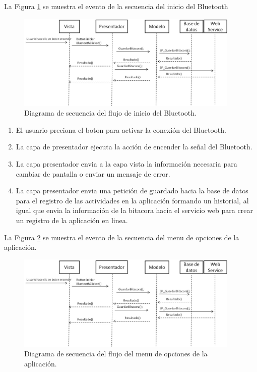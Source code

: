 La Figura \ref{ds2} se muestra el evento de la secuencia del inicio del Bluetooth
%
\begin{figure}[H]
\centering
\includegraphics[width=0.95\textwidth]{metodologia/DSIniciarBluetooth.jpg}
\caption{Diagrama de secuencia del flujo de inicio del Bluetooth.}
\label{ds2}
\end{figure}


 \begin{enumerate}
\item El usuario preciona el boton para activar la conexión del Bluetooth.
\item La capa de presentador ejecuta la acción de encender la señal del Bluetooth.
\item{La capa presentador envia a la capa vista la información necesaria para cambiar de pantalla o enviar un mensaje de error}.
\item La capa presentador envia una petición de guardado hacia la base de datos para el registro de las actividades en la aplicación formando un historial, al igual que envia la información de la bitacora hacia el servicio web para crear un registro de la aplicación en linea.
\end{enumerate}

La Figura \ref{ds3} se muestra el evento de la secuencia del menu de opciones de la aplicación.
%
\begin{figure}[H]
\centering
\includegraphics[width=0.95\textwidth]{metodologia/DSIniciarBluetooth.jpg}
\caption{Diagrama de secuencia del flujo del menu de opciones de la aplicación.}
\label{ds3}
\end{figure}
%


